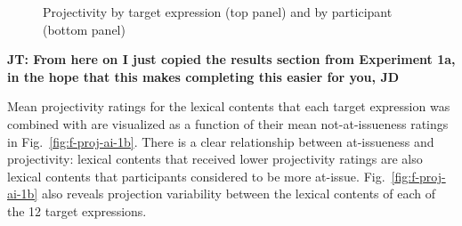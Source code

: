 \documentclass[11pt,fleqn]{article}
\newcommand{\6}{\mbox{$[\hspace*{-.6mm}[$}}
\newcommand{\9}{\mbox{$]\hspace*{-.6mm}]$}}
\newcommand{\figref}[1]{Fig.~\ref{#1}}
\newcommand{\jt}[1]{\textbf{\color{blue}JT: #1}}
\begin{document}
\begin{figure}[!h]
\centering


	

\caption{Projectivity by target expression (top panel) and by participant (bottom panel)}
\label{fig:f-proj-1b}
\end{figure}

\newpage

\jt{From here on I just copied the results section from Experiment 1a, in the hope that this makes completing this easier for you, JD}

Mean projectivity ratings for the lexical contents that each target expression was combined with are visualized as a function of their mean not-at-issueness ratings in \figref{fig:f-proj-ai-1b}. There is a clear relationship between at-issueness and projectivity: lexical contents that received lower projectivity ratings are also lexical contents that participants considered to be more at-issue. \figref{fig:f-proj-ai-1b} also reveals projection variability between the lexical contents of each of the 12 target expressions.
\end{document}
